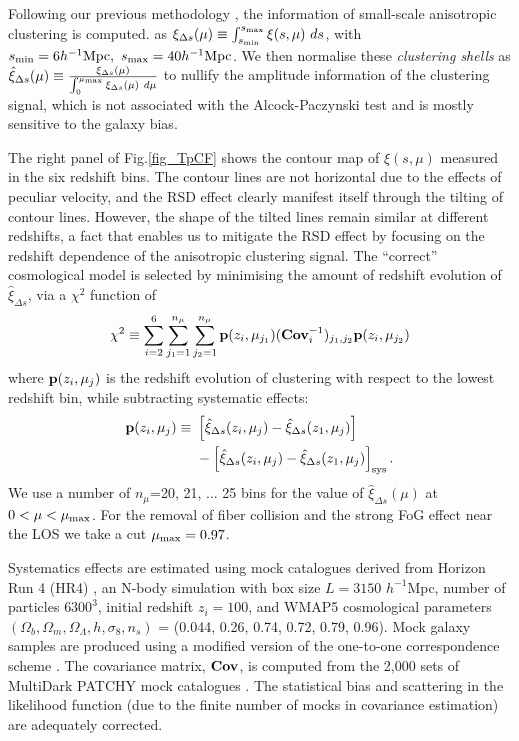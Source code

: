 \documentclass[prl,twocolumn,superscriptaddress,aps,amsmath,amssymb,nofootinbib,altaffilletter]{revtex4}
\begin{document}
Following our previous methodology \citep{Li2016}, the information of small-scale anisotropic clustering is computed.
as $\xi_{\Delta s} (\mu) \equiv \int_{s_{\rm min}}^{s_{\rm max}} \xi (s,\mu)\ ds$, 
with $s_{\rm min}=6 h^{-1} {\rm Mpc},\ s_{\rm max}=40 h^{-1} {\rm Mpc}$.
We then normalise these {\em clustering shells} as 
$\hat\xi_{\Delta s}(\mu) \equiv \frac{\xi_{\Delta s}(\mu)}{\int_{0}^{\mu_{\rm max}}\xi_{\Delta s}(\mu)\ d\mu}$
to nullify the amplitude information of the clustering signal, 
which is not associated with the Alcock-Paczynski test and is mostly sensitive to the galaxy bias.

The right panel of Fig.\ref{fig_TpCF} shows the contour map of $\xi(s,\mu)$ measured in the six redshift bins.
The contour lines are not horizontal due to the effects of peculiar velocity,
and the RSD effect clearly manifest itself through the tilting of contour lines.
However, the shape of the tilted lines remain similar at different redshifts, a fact that enables us  to mitigate the RSD effect by focusing on the redshift dependence of the anisotropic clustering signal.
The ``correct'' cosmological model is selected by minimising the amount of redshift evolution of $\hat\xi_{\Delta s}$,
via a $\chi^2$ function of 
\begin{equation}
 \chi^2\equiv \sum_{i=2}^{6} \sum_{j_1=1}^{n_{\mu}} \sum_{j_2=1}^{n_{\mu}} {\bf p}(z_i,\mu_{j_1}) ({\bf Cov}_{i}^{-1})_{j_1,j_2}  {\bf p}(z_i,\mu_{j_2})
\end{equation}
where ${\bf p}(z_i,\mu_{j})$ is the redshift evolution of clustering with respect to the lowest redshift bin,
while subtracting systematic effects:
\begin{eqnarray}
 {\bf p}(z_i,\mu_{j}) \equiv\ & \left[\hat\xi_{\Delta s}(z_i,\mu_j)-\hat\xi_{\Delta s}(z_1,\mu_j)\right] \\ \nonumber
 &- \left[\hat\xi_{\Delta s}(z_i,\mu_j)-\hat\xi_{\Delta s}(z_1,\mu_j)\right]_{\rm sys}.
\end{eqnarray}
We use a number of $n_{\mu}$=20, 21, ... 25 bins for the value of $\hat\xi_{\Delta s}(\mu)$ at $0<\mu<\mu_{\rm max}$.
For the removal of fiber collision and the strong FoG effect near the LOS we take a cut $\mu_{\rm max} = 0.97$.

Systematics effects are estimated using mock catalogues derived from Horizon Run 4 (HR4) \cite{HR4},
an N-body simulation with box size $L={3150}$ $h^{-1}$Mpc, number of particles $6300^3$,   
initial redshift $z_{i}=100$, and WMAP5\citep{komatsu2011} cosmological parameters 
$(\Omega_{b},\Omega_{m},\Omega_\Lambda,h,\sigma_8,n_s)$  = (0.044, 0.26, 0.74, 0.72, 0.79, 0.96). 
Mock galaxy samples are produced using a modified version of the one-to-one correspondence scheme \citep{hong2016}. 
The covariance matrix, ${\bf Cov}$, is computed from the 2,000 sets of MultiDark PATCHY mock catalogues \citep{MDPATCHY}.
The statistical bias and scattering in the likelihood function (due to the finite number of mocks in covariance estimation) 
are adequately corrected\citet{Hartlap,Percival2014}.
\end{document}
